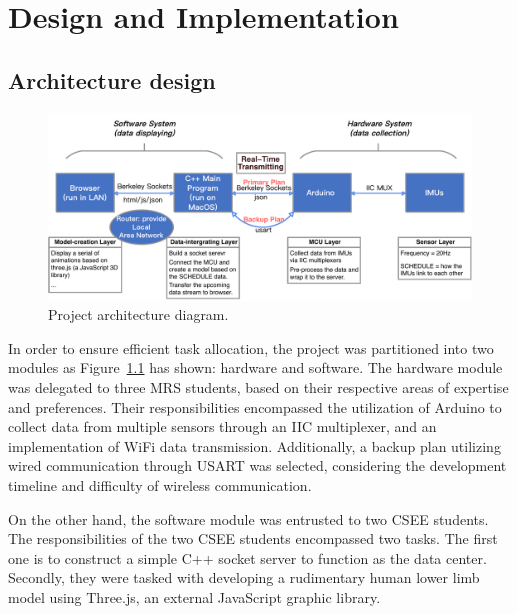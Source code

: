 \chapter{Design and Implementation}

\section{Architecture design}

\begin{figure}[htbp]
	\centering
	\includegraphics[clip, trim=0cm 0cm 0cm 0cm, width=1\textwidth]{
		fileForWriting/sketch_map}
	\caption[Project architecture diagram]{Project architecture diagram. }
	\label{fig:project-architecture-diagram}
\end{figure}

In order to ensure efficient task allocation, the project was partitioned into two modules as Figure~\ref{fig:project-architecture-diagram} has shown: hardware and software.
The hardware module was delegated to three MRS students, based on their respective areas of expertise and preferences.
Their responsibilities encompassed the utilization of Arduino to collect data from multiple sensors through an IIC multiplexer, and an implementation of WiFi data transmission.
Additionally, a backup plan utilizing wired communication through USART was selected, considering the development timeline and difficulty of wireless communication.

On the other hand, the software module was entrusted to two CSEE students.
The responsibilities of the two CSEE students encompassed two tasks.
The first one is to construct a simple C++ socket server to function as the data center.
Secondly, they were tasked with developing a rudimentary human lower limb model using Three.js, an external JavaScript graphic library.

